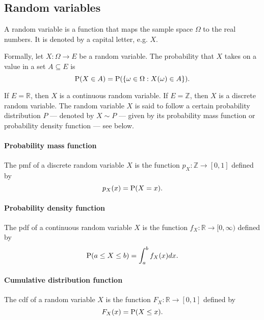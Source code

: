 \subsection{Random variables}

A random variable is a function that maps the sample space $\Omega$ to the real
numbers.  It is denoted by a capital letter, e.g. $X$.

Formally, let $X : \Omega \rightarrow E$ be a random variable.  The
probability that $X$ takes on a value in a set $A \subseteq E$ is
\begin{equation}
  \label{eq:rv}
  \operatorname{P}(X \in A) = \operatorname{P}(\{\omega \in \Omega : X(\omega) \in A\})\text{.}
\end{equation}

If $E = \mathbb{R}$, then $X$ is a continuous random variable.  If $E = \mathbb{Z}$,
then $X$ is a discrete random variable.  The random variable $X$ is said to follow
a certain probability distribution $P$ --- denoted by $X \sim P$ --- given by its
probability mass function or probability density function --- see below.

\paragraph{Probability mass function}

The \gls{pmf} of a discrete random variable $X$ is the
function $p_X : \mathbb{Z} \rightarrow [0, 1]$ defined by
\begin{equation}
  \label{eq:pmf}
  p_X(x) = \operatorname{P}(X = x)\text{.}
\end{equation}

\paragraph{Probability density function}

The \gls{pdf} of a continuous random variable $X$ is the
function $f_X : \mathbb{R} \rightarrow [0, \infty)$ defined by
\begin{equation}
  \label{eq:pdf}
  \operatorname{P}(a \leq X \leq b) = \int_a^b f_X(x) dx\text{.}
\end{equation}

\paragraph{Cumulative distribution function}

The \gls{cdf} of a random variable $X$ is the function
$F_X : \mathbb{R} \rightarrow [0, 1]$ defined by
\begin{equation}
  \label{eq:cdf}
  F_X(x) = \operatorname{P}(X \leq x)\text{.}
\end{equation}

